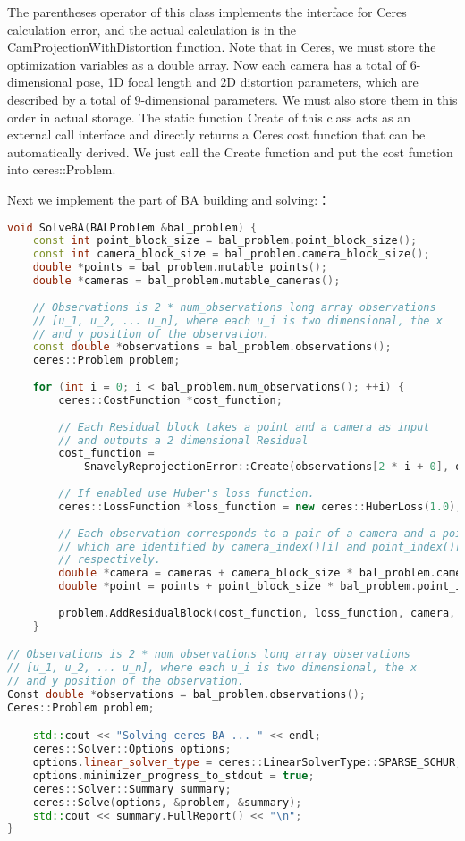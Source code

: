 The parentheses operator of this class implements the interface for Ceres calculation error, and the actual calculation is in the CamProjectionWithDistortion function. Note that in Ceres, we must store the optimization variables as a double array. Now each camera has a total of 6-dimensional pose, 1D focal length and 2D distortion parameters, which are described by a total of 9-dimensional parameters. We must also store them in this order in actual storage. The static function Create of this class acts as an external call interface and directly returns a Ceres cost function that can be automatically derived. We just call the Create function and put the cost function into ceres::Problem.

Next we implement the part of BA building and solving:：

\begin{lstlisting}[language=c++, caption=slambook2/ch9/SnavelyReprojectionError.cpp（片段）]
void SolveBA(BALProblem &bal_problem) {
	const int point_block_size = bal_problem.point_block_size();
	const int camera_block_size = bal_problem.camera_block_size();
	double *points = bal_problem.mutable_points();
	double *cameras = bal_problem.mutable_cameras();
	
	// Observations is 2 * num_observations long array observations
	// [u_1, u_2, ... u_n], where each u_i is two dimensional, the x
	// and y position of the observation.
	const double *observations = bal_problem.observations();
	ceres::Problem problem;
	
	for (int i = 0; i < bal_problem.num_observations(); ++i) {
		ceres::CostFunction *cost_function;
		
		// Each Residual block takes a point and a camera as input
		// and outputs a 2 dimensional Residual
		cost_function = 
			SnavelyReprojectionError::Create(observations[2 * i + 0], observations[2 * i + 1]);
		
		// If enabled use Huber's loss function.
		ceres::LossFunction *loss_function = new ceres::HuberLoss(1.0);
		
		// Each observation corresponds to a pair of a camera and a point
		// which are identified by camera_index()[i] and point_index()[i]
		// respectively.
		double *camera = cameras + camera_block_size * bal_problem.camera_index()[i];
		double *point = points + point_block_size * bal_problem.point_index()[i];
		
		problem.AddResidualBlock(cost_function, loss_function, camera, point);
	}

// Observations is 2 * num_observations long array observations
// [u_1, u_2, ... u_n], where each u_i is two dimensional, the x
// and y position of the observation.
Const double *observations = bal_problem.observations();
Ceres::Problem problem;

	std::cout << "Solving ceres BA ... " << endl;
	ceres::Solver::Options options;
	options.linear_solver_type = ceres::LinearSolverType::SPARSE_SCHUR;
	options.minimizer_progress_to_stdout = true;
	ceres::Solver::Summary summary;
	ceres::Solve(options, &problem, &summary);
	std::cout << summary.FullReport() << "\n";
}
\end{lstlisting}

